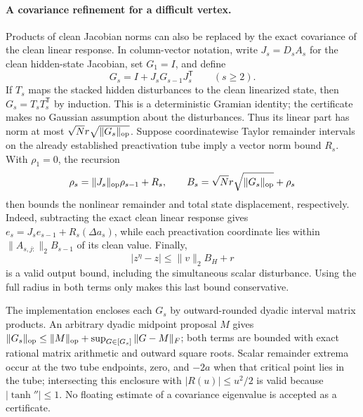 \paragraph{A covariance refinement for a difficult vertex.}
Products of clean Jacobian norms can also be replaced by the exact covariance of the clean linear response.  In column-vector notation, write $J_s=D_sA_s$ for the clean hidden-state Jacobian, set $G_1=I$, and define
\[
 G_s=I+J_sG_{s-1}J_s^{\mathsf T}\qquad(s\ge2).
\]
If $T_s$ maps the stacked hidden disturbances to the clean linearized state, then $G_s=T_sT_s^{\mathsf T}$ by induction.  This is a deterministic Gramian identity; the certificate makes no Gaussian assumption about the disturbances.  Thus its linear part has norm at most $\sqrt N r\sqrt{\|G_s\|_{\rm op}}$.  Suppose coordinatewise Taylor remainder intervals on the already established preactivation tube imply a vector norm bound $R_s$.  With $\rho_1=0$, the recursion
\[
 \rho_s=\|J_s\|_{\rm op}\rho_{s-1}+R_s,
 \qquad
 B_s=\sqrt N r\sqrt{\|G_s\|_{\rm op}}+\rho_s
\]
then bounds the nonlinear remainder and total state displacement, respectively.  Indeed, subtracting the exact clean linear response gives $e_s=J_se_{s-1}+R_s(\Delta a_s)$, while each preactivation coordinate lies within $\|A_{s,j:}\|_2B_{s-1}$ of its clean value.  Finally,
\[
 |z^\eta-z|\le\|v\|_2B_H+r
\]
is a valid output bound, including the simultaneous scalar disturbance.  Using the full radius in both terms only makes this last bound conservative.

The implementation encloses each $G_s$ by outward-rounded dyadic interval matrix products.  An arbitrary dyadic midpoint proposal $M$ gives
$\|G_s\|_{\rm op}\le\|M\|_{\rm op}+\sup_{G\in[G_s]}\|G-M\|_F$;
both terms are bounded with exact rational matrix arithmetic and outward square roots.  Scalar remainder extrema occur at the two tube endpoints, zero, and $-2a$ when that critical point lies in the tube; intersecting this enclosure with $|R(u)|\le u^2/2$ is valid because $|\tanh''|\le1$.  No floating estimate of a covariance eigenvalue is accepted as a certificate.
